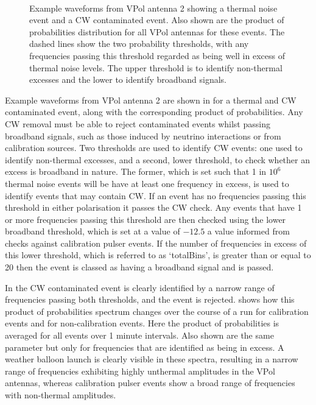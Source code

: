 \begin{figure}[htpb]
  \hfill
  \\
  \hfill
  \caption{Example waveforms from VPol antenna 2 showing a thermal noise event and a CW contaminated event. Also shown are the product of probabilities distribution for all VPol antennas for these events. The dashed lines show the two probability thresholds, with any frequencies passing this threshold regarded as being well in excess of thermal noise levels. The upper threshold is to identify non-thermal excesses and the lower to identify broadband signals.}
  \label{fig:analysis:CWRemoval:Baselines:Waveforms}
\end{figure}


Example waveforms from VPol antenna 2 are shown in  for a thermal and CW contaminated event, along with the corresponding product of probabilities. Any CW removal must be able to reject contaminated events whilst passing broadband signals, such as those induced by neutrino interactions or from calibration sources. Two thresholds are used to identify CW events: one used to identify non-thermal excesses, and a second, lower threshold, to check whether an excess is broadband in nature. The former, which is set such that 1 in $10^{6}$ thermal noise events will be have at least one frequency in excess, is used to identify events that may contain CW. If an event has no frequencies passing this threshold in either polarisation it passes the CW check. Any events that have 1 or more frequencies passing this threshold are then checked using the lower broadband threshold, which is set at a value of $-12.5$ a value informed from checks against calibration pulser events. If the number of frequencies in excess of this lower threshold, which is referred to as `totalBins', is greater than or equal to 20 then the event is classed as having a broadband signal and is passed. 


In  the CW contaminated event is clearly identified by a narrow range of frequencies passing both thresholds, and the event is rejected.  shows how this product of probabilities spectrum changes over the course of a run for calibration events and for non-calibration events. Here the product of probabilities is averaged for all events over 1 minute intervals. Also shown are the same parameter but only for frequencies that are identified as being in excess. A weather balloon launch is clearly visible in these spectra, resulting in a narrow range of frequencies exhibiting highly unthermal amplitudes in the VPol antennas, whereas calibration pulser events show a broad range of frequencies with non-thermal amplitudes.


